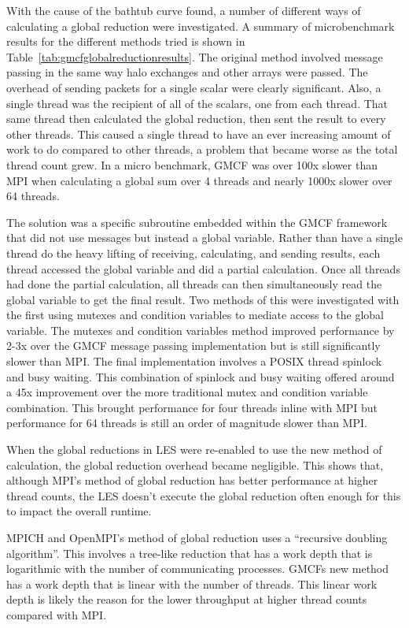 With the cause of the bathtub curve found, a number of different ways of
calculating a global reduction were investigated. A summary of microbenchmark
results for the different methods tried is shown in
Table~\ref{tab:gmcfglobalreductionresults}. The original method involved message
passing in the same way halo exchanges and other arrays were passed. The
overhead of sending packets for a single scalar were clearly significant. Also,
a single thread was the recipient of all of the scalars, one from each thread.
That same thread then calculated the global reduction, then sent the result to
every other threads. This caused a single thread to have an ever increasing
amount of work to do compared to other threads, a problem that became worse as
the total thread count grew. In a micro benchmark, GMCF was over 100x slower
than MPI when calculating a global sum over 4 threads and nearly 1000x slower
over 64 threads.

The solution was a specific subroutine embedded within the GMCF framework that
did not use messages but instead a global variable. Rather than have a single
thread do the heavy lifting of receiving, calculating, and sending results, each
thread accessed the global variable and did a partial calculation. Once all
threads had done the partial calculation, all threads can then simultaneously
read the global variable to get the final result. Two methods of this were
investigated with the first using mutexes and condition variables to mediate
access to the global variable. The mutexes and condition variables method
improved performance by 2-3x over the GMCF message passing implementation but is
still significantly slower than MPI. The final implementation involves a POSIX
thread spinlock and busy waiting. This combination of spinlock and busy waiting
offered around a 45x improvement over the more traditional mutex and condition
variable combination. This brought performance for four threads inline with MPI
but performance for 64 threads is still an order of magnitude slower than MPI.

When the global reductions in LES were re-enabled to use the new method of
calculation, the global reduction overhead became negligible. This shows that,
although MPI's method of global reduction has better performance at higher
thread counts, the LES doesn't execute the global reduction often enough for
this to impact the overall runtime.

MPICH and OpenMPI's method of global reduction uses a ``recursive doubling
algorithm''\cite{Thakur2003}. This involves a tree-like reduction that has a
work depth that is logarithmic with the number of communicating processes. GMCFs
new method has a work depth that is linear with the number of threads. This
linear work depth is likely the reason for the lower throughput at higher thread
counts compared with MPI.

